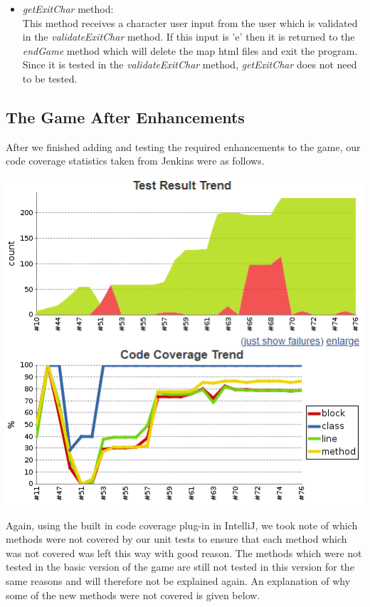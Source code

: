 \documentclass[a4paper,12pt]{extarticle}
\begin{document}
\begin{itemize}
     \item \textit{getExitChar} method:\\
     This method receives a character user input from the user which is validated in the 					 	 \textit{validateExitChar} method. If this input is 'e' then it is returned to the 						 	 \textit{endGame} method which will delete the map html files and exit the program. Since it is 		 	 tested in the \textit{validateExitChar} method, \textit{getExitChar} does not need to be tested.
     
\end{itemize}
\newpage

\subsection{The Game After Enhancements}

After we finished adding and testing the required enhancements to the game, our code coverage statistics taken from Jenkins were as follows.

\begin{center}
\includegraphics[scale = 0.75]{Figure5.png}\\
\end{center}

\noindent Again, using the built in code coverage plug-in in IntelliJ, we took note of which methods were not covered by our unit tests to ensure that each method which was not covered was left this way with good reason. The methods which were not tested in the basic version of the game are still not tested in this version for the same reasons and will therefore not be explained again. An explanation of why some of the new methods were not covered is given below.
\end{document}
